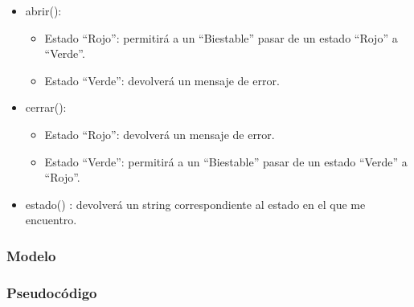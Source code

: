 \documentclass[11pt,a4paper]{article}
\begin{document}
\begin{itemize}
\item abrir():

	\begin{itemize}
	\item Estado ``Rojo'': permitirá a un ``Biestable'' pasar de un estado ``Rojo'' a ``Verde''.
	\item Estado ``Verde'': devolverá un mensaje de error.
	\end{itemize}
	
\item cerrar():

	\begin{itemize}
	\item Estado ``Rojo'': devolverá un mensaje de error.
	\item Estado ``Verde'':  permitirá a un ``Biestable'' pasar de un estado ``Verde'' a ``Rojo''.

	\end{itemize}
	
\item estado() : devolverá un string correspondiente al estado en el que me encuentro.
\end{itemize}



\subsubsection{Modelo}

\begin{figure}[H]
\end{figure}


\subsubsection{Pseudocódigo}
\end{document}
